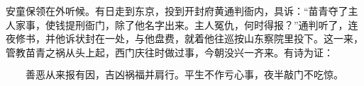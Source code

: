 安童保领在外听候。有日走到东京，投到开封府黄通判衙内，具诉：“苗青夺了主人家事，使钱提刑衙门，除了他名字出来。主人冤仇，何时得报？”通判听了，连夜修书，并他诉状封在一处，与他盘费，就着他往巡按山东察院里投下。这一来，管教苗青之祸从头上起，西门庆往时做过事，今朝没兴一齐来。有诗为证：

\[
善恶从来报有因，吉凶祸福并肩行。
平生不作亏心事，夜半敲门不吃惊。
\]
